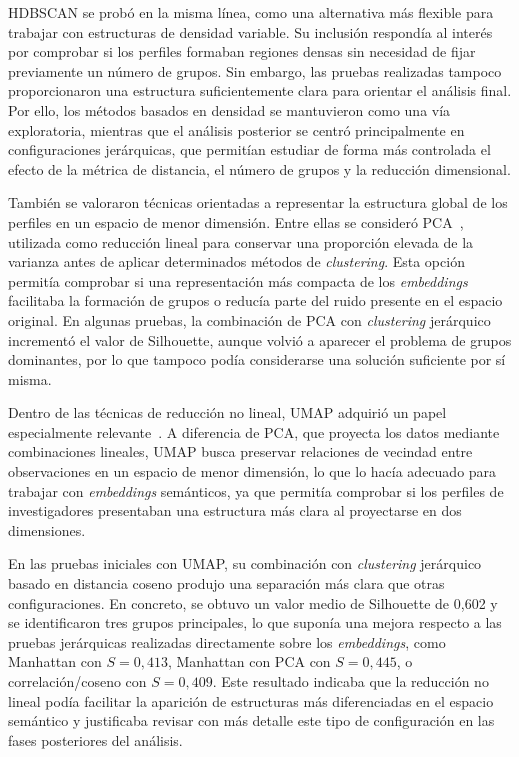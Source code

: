 \documentclass[11pt,spanish,listoffigures,listoftables]{tfgetsinf}
\begin{document}
HDBSCAN se probó en la misma línea, como una alternativa más flexible para trabajar con estructuras de densidad variable. Su inclusión respondía al interés por comprobar si los perfiles formaban regiones densas sin necesidad de fijar previamente un número de grupos. Sin embargo, las pruebas realizadas tampoco proporcionaron una estructura suficientemente clara para orientar el análisis final. Por ello, los métodos basados en densidad se mantuvieron como una vía exploratoria, mientras que el análisis posterior se centró principalmente en configuraciones jerárquicas, que permitían estudiar de forma más controlada el efecto de la métrica de distancia, el número de grupos y la reducción dimensional.

También se valoraron técnicas orientadas a representar la estructura global de los perfiles en un espacio de menor dimensión. Entre ellas se consideró PCA~\cite{jolliffe}, utilizada como reducción lineal para conservar una proporción elevada de la varianza antes de aplicar determinados métodos de \textit{clustering}. Esta opción permitía comprobar si una representación más compacta de los \textit{embeddings} facilitaba la formación de grupos o reducía parte del ruido presente en el espacio original. En algunas pruebas, la combinación de PCA con \textit{clustering} jerárquico incrementó el valor de Silhouette, aunque volvió a aparecer el problema de grupos dominantes, por lo que tampoco podía considerarse una solución suficiente por sí misma.

Dentro de las técnicas de reducción no lineal, UMAP adquirió un papel especialmente relevante~\cite{umap}. A diferencia de PCA, que proyecta los datos mediante combinaciones lineales, UMAP busca preservar relaciones de vecindad entre observaciones en un espacio de menor dimensión, lo que lo hacía adecuado para trabajar con \textit{embeddings} semánticos, ya que permitía comprobar si los perfiles de investigadores presentaban una estructura más clara al proyectarse en dos dimensiones.

En las pruebas iniciales con UMAP, su combinación con \textit{clustering} jerárquico basado en distancia coseno produjo una separación más clara que otras configuraciones. En concreto, se obtuvo un valor medio de Silhouette de 0,602 y se identificaron tres grupos principales, lo que suponía una mejora respecto a las pruebas jerárquicas realizadas directamente sobre los \textit{embeddings}, como Manhattan con \(S=0,413\), Manhattan con PCA con \(S=0,445\), o correlación/coseno con \(S=0,409\). Este resultado indicaba que la reducción no lineal podía facilitar la aparición de estructuras más diferenciadas en el espacio semántico y justificaba revisar con más detalle este tipo de configuración en las fases posteriores del análisis.
\end{document}
